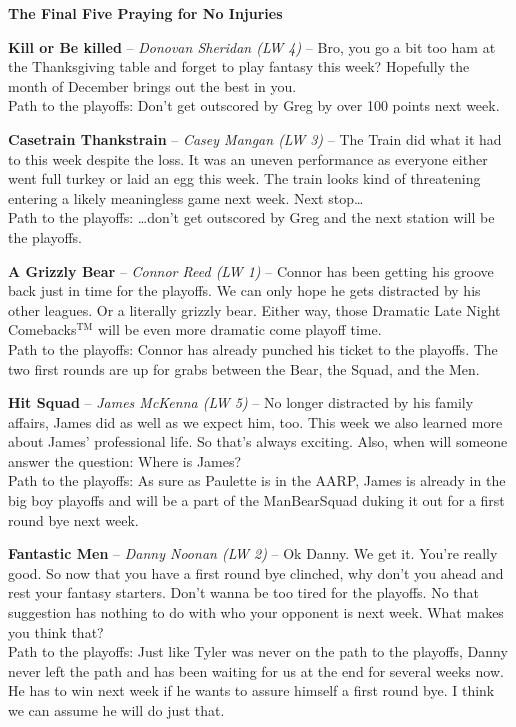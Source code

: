 \documentclass[11pt,letterpaper]{article}
\begin{document}
\textbf{\large{The Final Five Praying for No Injuries}}
\begin{etaremune}
\setcounter{enumi}{6}
\item \textbf{Kill or Be killed} -- \textit{Donovan Sheridan (LW 4)} -- Bro, you go a bit too ham at the Thanksgiving table and forget to play fantasy this week? Hopefully the month of December brings out the best in you.
\medskip\\Path to the playoffs: Don't get outscored by Greg by over 100 points next week.
\item \textbf{Casetrain Thankstrain} -- \textit{Casey Mangan (LW 3)} -- The Train did what it had to this week despite the loss. It was an uneven performance as everyone either went full turkey or laid an egg this week. The train looks kind of threatening entering a likely meaningless game next week. Next stop\dots 
\medskip\\Path to the playoffs: \dots don't get outscored by Greg and the next station will be the playoffs.
\item \textbf{A Grizzly Bear} -- \textit{Connor Reed (LW 1)} -- Connor has been getting his groove back just in time for the playoffs. We can only hope he gets distracted by his other leagues. Or a literally grizzly bear. Either way, those Dramatic Late Night Comebacks$^\text{TM}$ will be even more dramatic come playoff time.  
\medskip\\Path to the playoffs: Connor has already punched his ticket to the playoffs. The two first rounds are up for grabs between the Bear, the Squad, and the Men.
\item \textbf{Hit Squad} -- \textit{James McKenna (LW 5)} -- No longer distracted by his family affairs, James did as well as we expect him, too. This week we also learned more about James' professional life. So that's always exciting. Also, when will someone answer the question: Where is James?
\medskip\\Path to the playoffs: As sure as Paulette is in the AARP, James is already in the big boy playoffs and will be a part of the ManBearSquad duking it out for a first round bye next week. 
\item \textbf{Fantastic Men} -- \textit{Danny Noonan (LW 2)} -- Ok Danny. We get it. You're really good. So now that you have a first round bye clinched, why don't you ahead and rest your fantasy starters. Don't wanna be too tired for the playoffs. No that suggestion has nothing to do with who your opponent is next week. What makes you think that?
\medskip\\Path to the playoffs: Just like Tyler was never on the path to the playoffs, Danny never left the path and has been waiting for us at the end for several weeks now. He has to win next week if he wants to assure himself a first round bye. I think we can assume he will do just that.
\end{etaremune}
\end{document}
